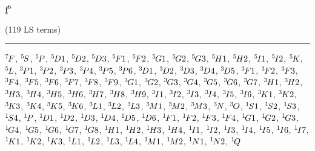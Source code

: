\begin{mdframed}
\begin{center}
$\underbar{$\text{f}$}^{6}$

(119 LS terms)
\vspace{0.25cm}
\hrule
\vspace{0.25cm}

${}^{7}{\kern-0.1em}{F}$, ${}^{5}{\kern-0.1em}{S}$, ${}^{5}{\kern-0.1em}{P}$, ${}^{5}{\kern-0.1em}{D1}$, ${}^{5}{\kern-0.1em}{D2}$, ${}^{5}{\kern-0.1em}{D3}$, ${}^{5}{\kern-0.1em}{F1}$, ${}^{5}{\kern-0.1em}{F2}$, ${}^{5}{\kern-0.1em}{G1}$, ${}^{5}{\kern-0.1em}{G2}$, ${}^{5}{\kern-0.1em}{G3}$, ${}^{5}{\kern-0.1em}{H1}$, ${}^{5}{\kern-0.1em}{H2}$, ${}^{5}{\kern-0.1em}{I1}$, ${}^{5}{\kern-0.1em}{I2}$, ${}^{5}{\kern-0.1em}{K}$, ${}^{5}{\kern-0.1em}{L}$, ${}^{3}{\kern-0.1em}{P1}$, ${}^{3}{\kern-0.1em}{P2}$, ${}^{3}{\kern-0.1em}{P3}$, ${}^{3}{\kern-0.1em}{P4}$, ${}^{3}{\kern-0.1em}{P5}$, ${}^{3}{\kern-0.1em}{P6}$, ${}^{3}{\kern-0.1em}{D1}$, ${}^{3}{\kern-0.1em}{D2}$, ${}^{3}{\kern-0.1em}{D3}$, ${}^{3}{\kern-0.1em}{D4}$, ${}^{3}{\kern-0.1em}{D5}$, ${}^{3}{\kern-0.1em}{F1}$, ${}^{3}{\kern-0.1em}{F2}$, ${}^{3}{\kern-0.1em}{F3}$, ${}^{3}{\kern-0.1em}{F4}$, ${}^{3}{\kern-0.1em}{F5}$, ${}^{3}{\kern-0.1em}{F6}$, ${}^{3}{\kern-0.1em}{F7}$, ${}^{3}{\kern-0.1em}{F8}$, ${}^{3}{\kern-0.1em}{F9}$, ${}^{3}{\kern-0.1em}{G1}$, ${}^{3}{\kern-0.1em}{G2}$, ${}^{3}{\kern-0.1em}{G3}$, ${}^{3}{\kern-0.1em}{G4}$, ${}^{3}{\kern-0.1em}{G5}$, ${}^{3}{\kern-0.1em}{G6}$, ${}^{3}{\kern-0.1em}{G7}$, ${}^{3}{\kern-0.1em}{H1}$, ${}^{3}{\kern-0.1em}{H2}$, ${}^{3}{\kern-0.1em}{H3}$, ${}^{3}{\kern-0.1em}{H4}$, ${}^{3}{\kern-0.1em}{H5}$, ${}^{3}{\kern-0.1em}{H6}$, ${}^{3}{\kern-0.1em}{H7}$, ${}^{3}{\kern-0.1em}{H8}$, ${}^{3}{\kern-0.1em}{H9}$, ${}^{3}{\kern-0.1em}{I1}$, ${}^{3}{\kern-0.1em}{I2}$, ${}^{3}{\kern-0.1em}{I3}$, ${}^{3}{\kern-0.1em}{I4}$, ${}^{3}{\kern-0.1em}{I5}$, ${}^{3}{\kern-0.1em}{I6}$, ${}^{3}{\kern-0.1em}{K1}$, ${}^{3}{\kern-0.1em}{K2}$, ${}^{3}{\kern-0.1em}{K3}$, ${}^{3}{\kern-0.1em}{K4}$, ${}^{3}{\kern-0.1em}{K5}$, ${}^{3}{\kern-0.1em}{K6}$, ${}^{3}{\kern-0.1em}{L1}$, ${}^{3}{\kern-0.1em}{L2}$, ${}^{3}{\kern-0.1em}{L3}$, ${}^{3}{\kern-0.1em}{M1}$, ${}^{3}{\kern-0.1em}{M2}$, ${}^{3}{\kern-0.1em}{M3}$, ${}^{3}{\kern-0.1em}{N}$, ${}^{3}{\kern-0.1em}{O}$, ${}^{1}{\kern-0.1em}{S1}$, ${}^{1}{\kern-0.1em}{S2}$, ${}^{1}{\kern-0.1em}{S3}$, ${}^{1}{\kern-0.1em}{S4}$, ${}^{1}{\kern-0.1em}{P}$, ${}^{1}{\kern-0.1em}{D1}$, ${}^{1}{\kern-0.1em}{D2}$, ${}^{1}{\kern-0.1em}{D3}$, ${}^{1}{\kern-0.1em}{D4}$, ${}^{1}{\kern-0.1em}{D5}$, ${}^{1}{\kern-0.1em}{D6}$, ${}^{1}{\kern-0.1em}{F1}$, ${}^{1}{\kern-0.1em}{F2}$, ${}^{1}{\kern-0.1em}{F3}$, ${}^{1}{\kern-0.1em}{F4}$, ${}^{1}{\kern-0.1em}{G1}$, ${}^{1}{\kern-0.1em}{G2}$, ${}^{1}{\kern-0.1em}{G3}$, ${}^{1}{\kern-0.1em}{G4}$, ${}^{1}{\kern-0.1em}{G5}$, ${}^{1}{\kern-0.1em}{G6}$, ${}^{1}{\kern-0.1em}{G7}$, ${}^{1}{\kern-0.1em}{G8}$, ${}^{1}{\kern-0.1em}{H1}$, ${}^{1}{\kern-0.1em}{H2}$, ${}^{1}{\kern-0.1em}{H3}$, ${}^{1}{\kern-0.1em}{H4}$, ${}^{1}{\kern-0.1em}{I1}$, ${}^{1}{\kern-0.1em}{I2}$, ${}^{1}{\kern-0.1em}{I3}$, ${}^{1}{\kern-0.1em}{I4}$, ${}^{1}{\kern-0.1em}{I5}$, ${}^{1}{\kern-0.1em}{I6}$, ${}^{1}{\kern-0.1em}{I7}$, ${}^{1}{\kern-0.1em}{K1}$, ${}^{1}{\kern-0.1em}{K2}$, ${}^{1}{\kern-0.1em}{K3}$, ${}^{1}{\kern-0.1em}{L1}$, ${}^{1}{\kern-0.1em}{L2}$, ${}^{1}{\kern-0.1em}{L3}$, ${}^{1}{\kern-0.1em}{L4}$, ${}^{1}{\kern-0.1em}{M1}$, ${}^{1}{\kern-0.1em}{M2}$, ${}^{1}{\kern-0.1em}{N1}$, ${}^{1}{\kern-0.1em}{N2}$, ${}^{1}{\kern-0.1em}{Q}$
\end{center}
\end{mdframed}

